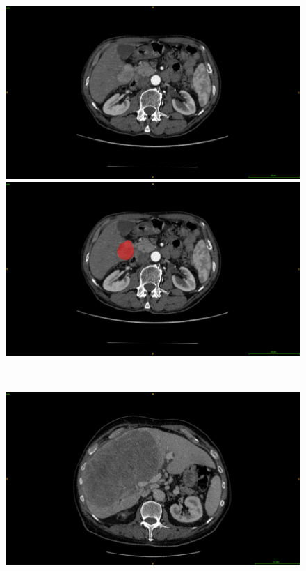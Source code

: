 \begin{figure}[!ht]
	\centering
	\begin{minipage}{0.45\linewidth}
		\includegraphics[width=\linewidth]{../Contributions/images/ResizeGDB_examplePatientSmallTumor}
	\end{minipage} \hspace{-0.1cm}
	\begin{minipage}{0.45\linewidth}
		\includegraphics[width=\linewidth]{../Contributions/images/ResizeGDB_examplePatientSmallTumor_seg}
	\end{minipage} \\
	\begin{minipage}{0.45\linewidth}
		\includegraphics[width=\linewidth]{../Contributions/images/ResizeGDB_examplePatientLargeTumor}

\end{minipage}
\end{figure}
